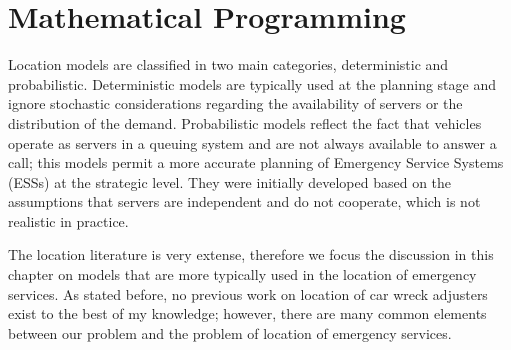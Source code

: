\section{Mathematical Programming}
Location models
are classified in two main categories,
deterministic and probabilistic.
Deterministic models
are typically used at the planning stage
and ignore stochastic considerations
regarding the availability of servers
or the distribution of the demand.
Probabilistic models
reflect the fact that
vehicles operate as servers in a queuing system
and are not always available
to answer a call;
this models permit
a more accurate planning
of Emergency Service Systems (ESSs)
at the strategic level.
They were initially developed
based on the assumptions
that servers are independent
and do not cooperate,
which is not realistic in practice.

The location literature is very extense,
therefore
we focus the discussion in this chapter
on models
that are more typically used
in the location of emergency services.
As stated before,
no previous work
on location of car wreck adjusters exist
to the best of my knowledge;
however,
there are many common elements
between our problem
and the problem of location of emergency services.



